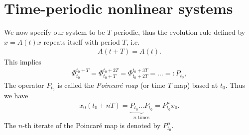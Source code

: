 \section{Time-periodic nonlinear systems}
We now specify our system to be $T$-periodic, thus the evolution rule defined by $\dot{x}=A(t)x$ repeats itself with period $T$, i.e.
\begin{align}
	A(t+T) = A(t).
\end{align}
This implies
\begin{align}
	\Phi_{t_0}^{t_0 +T} = 	\Phi_{t_0+T}^{t_0 +2T} =\Phi_{t_0+2T}^{t_0 +3T} =\ldots =: P_{t_0},  
\end{align}
The operator $P_{t_0}$ is called the \emph{Poincaré map} (or time $T$ map) based at $t_0$. Thus we have
\begin{align}
x_0(t_0+nT) = \underbrace{P_{t_0} \ldots P_{t_0}}_{n  \textrm{ times} } = P_{t_0}^{n}x_0.
\end{align}
The $n$-th iterate of the Poincaré map is denoted by $P_{t_0}^{n}$.


